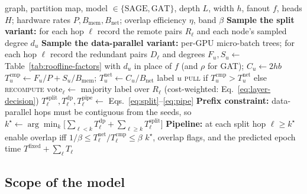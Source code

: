 \begin{algorithm}[h]
\caption{Roofline-guided choice of the per-layer strategy}
\label{alg:roofline}
\begin{algorithmic}[1]
\Require graph, partition map, model $\in\{\text{SAGE},\text{GAT}\}$, depth $L$, width $h$,
         fanout $f$, heads $H$; hardware rates $P, B_{\mathrm{mem}}, B_{\mathrm{net}}$;
         overlap efficiency $\eta$, band $\beta$
\State \textbf{Sample the split variant:} for each hop $\ell$ record the remote pairs
       $R_\ell$ and each node's sampled degree $d_u$ 
\State \textbf{Sample the data-parallel variant:} per-GPU micro-batch trees; for each hop
       $\ell$ record the redundant pairs $D_\ell$ and degrees 
    \State $F_u, S_u \gets$ Table~\ref{tab:roofline-factors} with $d_u$ in place of $f$
           (and $\rho$ for GAT); $C_u \gets 2hb$
    \State $T^{\mathrm{cmp}}_u \gets F_u/P + S_u/B_{\mathrm{mem}}$;\quad
           $T^{\mathrm{net}}_u \gets C_u/B_{\mathrm{net}}$
    \State label $u$ \textsc{pull} if $T^{\mathrm{cmp}}_u > T^{\mathrm{net}}_u$ else \textsc{recompute}
  \EndFor
  \State $\mathrm{vote}_\ell \gets$ majority label over $R_\ell$ (cost-weighted: Eq.~\eqref{eq:layer-decision})
  \State $T^{\mathrm{split}}_\ell, T^{\mathrm{dp}}_\ell, T^{\mathrm{pipe}}_\ell \gets$ Eqs.~\eqref{eq:split}--\eqref{eq:pipe}
\EndFor
\State \textbf{Prefix constraint:} data-parallel hops must be contiguous from the seeds, so
       $k^\star \gets \arg\min_k \big[\sum_{\ell<k} T^{\mathrm{dp}}_\ell + \sum_{\ell\ge k} T^{\mathrm{split}}_\ell\big]$
\State \textbf{Pipeline:} at each split hop $\ell\ge k^\star$ enable overlap iff
       $1/\beta \le T^{\mathrm{net}}_\ell / T^{\mathrm{cmp}}_\ell \le \beta$
\State \Return $k^\star$, overlap flags, and the predicted epoch time
       $T^{\mathrm{fixed}} + \sum_\ell T_\ell$ 
\end{algorithmic}
\end{algorithm}

\subsection{Scope of the model}
\label{sec:roofline-scope}


